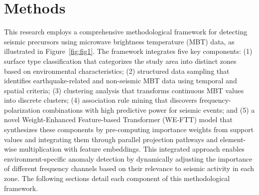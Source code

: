 \documentclass[fleqn,10pt]{wlscirep_mdpi_style}
\begin{document}
 \FloatBarrier 
\section{Methods} %
This research employs a comprehensive methodological framework for detecting seismic precursors using microwave brightness temperature (MBT) data, as illustrated in Figure~\ref{fig:fig1}. The framework integrates five key components: (1) surface type classification that categorizes the study area into distinct zones based on environmental characteristics; (2) structured data sampling that identifies earthquake-related and non-seismic MBT data using temporal and spatial criteria; (3) clustering analysis that transforms continuous MBT values into discrete clusters; (4) association rule mining that discovers frequency-polarization combinations with high predictive power for seismic events; and (5) a novel Weight-Enhanced Feature-based Transformer (WE-FTT) model that synthesizes these components by pre-computing importance weights from support values and integrating them through parallel projection pathways and element-wise multiplication with feature embeddings. This integrated approach enables environment-specific anomaly detection by dynamically adjusting the importance of different frequency channels based on their relevance to seismic activity in each zone. The following sections detail each component of this methodological framework.
\end{document}
